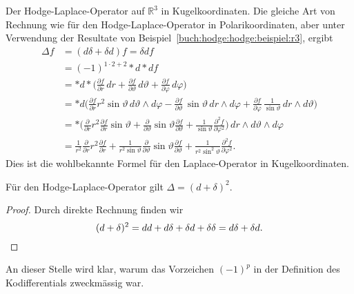 \begin{beispiel}
Der Hodge-Laplace-Operator auf $\mathbb{R}^3$ in
Kugelkoordinaten.
Die gleiche Art von Rechnung wie für den Hodge-Laplace-Operator in
Polarikoordinaten, aber unter Verwendung der Resultate von
Beispiel~\ref{buch:hodge:hodge:beispiel:r3}, ergibt 
\begin{align*}
\Delta f
&=
(d\delta + \delta d) f
=
\delta d f
\\
&=
(-1)^{1\cdot 2+2}
{\ast}d{\ast}df
\\
&=
{\ast}d{\ast}\biggl(
\frac{\partial f}{\partial r}\,dr
+
\frac{\partial f}{\partial\vartheta}\,d\vartheta
+
\frac{\partial f}{\partial\varphi}\,d\varphi
\biggr)
\\
&=
{\ast}d\biggl(
\frac{\partial f}{\partial r} r^2\sin\vartheta \, d\vartheta\wedge d\varphi
-
\frac{\partial f}{\partial\vartheta}\,\sin\vartheta\,dr\wedge d\varphi
+
\frac{\partial f}{\partial\varphi}\,\frac{1}{\sin\vartheta}\,dr\wedge d\vartheta
\biggr)
\\
&=
{\ast}
\biggl(
\frac{\partial}{\partial r}r^2\frac{\partial f}{\partial r}
\sin\vartheta
+
\frac{\partial}{\partial \vartheta}
\sin\vartheta
\frac{\partial f}{\partial \vartheta}
+
\frac{1}{\sin\vartheta}
\frac{\partial^2 f}{\partial\varphi^2}
\biggr)
\,dr\wedge d\vartheta\wedge d\varphi
\\
&=
\frac{1}{r^2}
\frac{\partial}{\partial r}r^2\frac{\partial f}{\partial r}
+
\frac{1}{r^2\sin\vartheta}
\frac{\partial}{\partial \vartheta}
\sin\vartheta
\frac{\partial f}{\partial \vartheta}
+
\frac{1}{r^2\sin^2\vartheta}
\frac{\partial^2 f}{\partial \varphi^2}.
\end{align*}
Dies ist die wohlbekannte Formel für den Laplace-Operator in 
Kugelkoordinaten.
\end{beispiel}

\begin{satz}
Für den Hodge-Laplace-Operator gilt $\Delta = (d+\delta)^2$.
\end{satz}

\begin{proof}
Durch direkte Rechnung finden wir
\[
(d+\delta)^2
=
dd+d\delta+\delta d+\delta\delta
=
d\delta +\delta d.
\qedhere
\]
\end{proof}

An dieser Stelle wird klar, warum das Vorzeichen $(-1)^p$ in der
Definition des Kodifferentials zweckmässig war.


